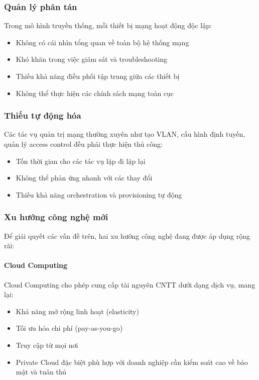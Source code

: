 \subsubsection{Quản lý phân tán}
Trong mô hình truyền thống, mỗi thiết bị mạng hoạt động độc lập:
\begin{itemize}
    \item Không có cái nhìn tổng quan về toàn bộ hệ thống mạng
    \item Khó khăn trong việc giám sát và troubleshooting
    \item Thiếu khả năng điều phối tập trung giữa các thiết bị
    \item Không thể thực hiện các chính sách mạng toàn cục
\end{itemize}

\subsubsection{Thiếu tự động hóa}
Các tác vụ quản trị mạng thường xuyên như tạo VLAN, cấu hình định tuyến, quản lý access control đều phải thực hiện thủ công:
\begin{itemize}
    \item Tốn thời gian cho các tác vụ lặp đi lặp lại
    \item Không thể phản ứng nhanh với các thay đổi
    \item Thiếu khả năng orchestration và provisioning tự động
\end{itemize}

\subsubsection{Xu hướng công nghệ mới}
Để giải quyết các vấn đề trên, hai xu hướng công nghệ đang được áp dụng rộng rãi:

\paragraph{Cloud Computing}
Cloud Computing cho phép cung cấp tài nguyên CNTT dưới dạng dịch vụ, mang lại:
\begin{itemize}
    \item Khả năng mở rộng linh hoạt (elasticity)
    \item Tối ưu hóa chi phí (pay-as-you-go)
    \item Truy cập từ mọi nơi
    \item Private Cloud đặc biệt phù hợp với doanh nghiệp cần kiểm soát cao về bảo mật và tuân thủ
\end{itemize}

